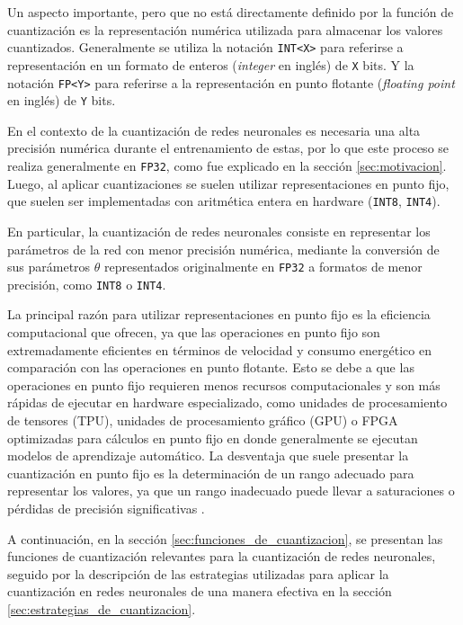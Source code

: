 Un aspecto importante, pero que no está directamente definido por la función de cuantización es la representación numérica utilizada para almacenar los valores cuantizados. Generalmente se utiliza la notación \texttt{INT<X>} para referirse a representación en un formato de enteros (\textit{integer} en inglés) de \texttt{X} bits. Y la notación \texttt{FP<Y>} para referirse a la representación en punto flotante (\textit{floating point} en inglés) de \texttt{Y} bits.

En el contexto de la cuantización de redes neuronales es necesaria una alta precisión numérica durante el entrenamiento de estas, por lo que este proceso se realiza generalmente en \texttt{FP32}, como fue explicado en la sección \ref{sec:motivacion}. Luego, al aplicar cuantizaciones se suelen utilizar representaciones en punto fijo, que suelen ser implementadas con aritmética entera en hardware (\texttt{INT8}, \texttt{INT4}).

En particular, la cuantización de redes neuronales consiste en representar los parámetros de la red con menor precisión numérica, mediante la conversión de sus parámetros $\theta$ representados originalmente en \texttt{FP32} a formatos de menor precisión, como \texttt{INT8} o \texttt{INT4}.

La principal razón para utilizar representaciones en punto fijo es la eficiencia computacional que ofrecen, ya que las operaciones en punto fijo son extremadamente eficientes en términos de velocidad y consumo energético en comparación con las operaciones en punto flotante. Esto se debe a que las operaciones en punto fijo requieren menos recursos computacionales y son más rápidas de ejecutar en hardware especializado, como unidades de procesamiento de tensores (TPU), unidades de procesamiento gráfico (GPU) o FPGA optimizadas para cálculos en punto fijo en donde generalmente se ejecutan modelos de aprendizaje automático. La desventaja que suele presentar la cuantización en punto fijo es la determinación de un rango adecuado para representar los valores, ya que un rango inadecuado puede llevar a saturaciones o pérdidas de precisión significativas \cite{gholami2021surveyquantizationmethodsefficient}.

A continuación, en la sección \ref{sec:funciones_de_cuantizacion}, se presentan las funciones de cuantización relevantes para la cuantización de redes neuronales, seguido por la descripción de las estrategias utilizadas para aplicar la cuantización en redes neuronales de una manera efectiva en la sección \ref{sec:estrategias_de_cuantizacion}.

